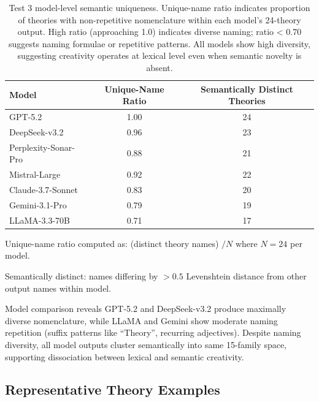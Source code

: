 \begin{table}[htbp]
  \centering
  \begin{footnotesize}
  \caption{Test 3 model-level semantic uniqueness. Unique-name ratio indicates proportion of theories with non-repetitive nomenclature within each model's 24-theory output. High ratio (approaching 1.0) indicates diverse naming; ratio < 0.70 suggests naming formulae or repetitive patterns. All models show high diversity, suggesting creativity operates at lexical level even when semantic novelty is absent.}
  \label{tab:t3_model_uniqueness}
  \begin{threeparttable}
  \begin{tabularx}{\textwidth}{@{}Y S[table-format=1.2] S[table-format=2.0]@{}}
    \toprule
    \textbf{Model} & \textbf{Unique-Name Ratio} & \textbf{Semantically Distinct Theories} \\
    \midrule
    GPT-5.2 & 1.00 & 24 \\
    DeepSeek-v3.2 & 0.96 & 23 \\
    Perplexity-Sonar-Pro & 0.88 & 21 \\
    Mistral-Large & 0.92 & 22 \\
    Claude-3.7-Sonnet & 0.83 & 20 \\
    Gemini-3.1-Pro & 0.79 & 19 \\
    LLaMA-3.3-70B & 0.71 & 17 \\
    \bottomrule
  \end{tabularx}
  \begin{tablenotes}
    \item Unique-name ratio computed as: (distinct theory names) $/N$ where $N=24$ per model.
    \item Semantically distinct: names differing by $>0.5$ Levenshtein distance from other output names within model.
  \end{tablenotes}
  \end{threeparttable}
  \end{footnotesize}
\end{table}

Model comparison reveals GPT-5.2 and DeepSeek-v3.2 produce maximally diverse nomenclature, while LLaMA and Gemini show moderate naming repetition (suffix patterns like ``Theory'', recurring adjectives). Despite naming diversity, all model outputs cluster semantically into same 15-family space, supporting dissociation between lexical and semantic creativity.

\subsection{Representative Theory Examples}
\label{sec:t3_exemplars}

